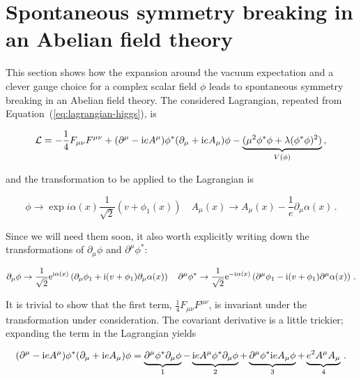 \clearpage
\section{Spontaneous symmetry breaking in an Abelian field theory}
\label{app:theory}

This section shows how the expansion around the vacuum expectation and a clever gauge choice for a complex scalar field $\phi$ leads to spontaneous symmetry breaking in an Abelian field theory.
% 
The considered Lagrangian, repeated from Equation~(\ref{eq:lagrangian-higgs}), is
% 
\begin{linenomath*}
\begin{equation}
\label{eq:lagrangian-higgs-copy}
\mathcal{L} =
    -\frac{1}{4} F_{\mu\nu} F^{\mu\nu}
    + (\partial^\mu - \mathrm{i} e A^\mu) \phi^\ast (\partial_\mu + \mathrm{i} e A_\mu) \phi
    - \underbrace{(\mu^2 \phi^\ast \phi + \lambda (\phi^\ast \phi)^2)}_{V(\phi)}
\,,
\end{equation}
\end{linenomath*}
% 
and the transformation to be applied to the Lagrangian is
% 
\begin{linenomath*}
\begin{equation}
\label{eq:transformation-higgs-copy}
\phi \to \exp{i\alpha(x)} \frac{1}{\sqrt{2}} \left( v + \phi_1(x) \right)
\quad
A_\mu(x) \to A_\mu(x) - \frac{1}{e} \partial_\mu \alpha(x)
\,.
\end{equation}
\end{linenomath*}
% 
Since we will need them soon, it also worth explicitly writing down the transformations of $\partial_\mu \phi$ and $\partial^\mu \phi^\ast$:
% 
\begin{linenomath*}
\begin{equation}
\partial_\mu \phi \to
    \frac{1}{\sqrt{2}} \mathrm{e}^{\mathrm{i} \alpha(x)} \left(
    \partial_\mu \phi_1 + \mathrm{i} (v+\phi_1) \partial_\mu \alpha(x)
    \right)
\quad
\partial^\mu \phi^\ast \to
    \frac{1}{\sqrt{2}} \mathrm{e}^{-\mathrm{i} \alpha(x)} \left(
    \partial^\mu \phi_1 - \mathrm{i} (v+\phi_1) \partial^\mu \alpha(x)
    \right)
\,.
\end{equation}
\end{linenomath*}
% 
It is trivial to show that the first term, $\frac{1}{4} F_{\mu\nu} F^{\mu\nu}$, is invariant under the transformation under consideration.
% 
The covariant derivative is a little trickier; expanding the term in the Lagrangian yields
% 
\begin{linenomath*}
\begin{equation}
\label{eq:covariant-derivative}
(\partial^\mu - \mathrm{i} e A^\mu) \phi^\ast (\partial_\mu + \mathrm{i} e A_\mu) \phi
=
\underbrace{\partial^\mu \phi^\ast \partial_\mu \phi}_1
- \underbrace{\mathrm{i} e A^\mu \phi^\ast \partial_\mu \phi}_2
+ \underbrace{\partial^\mu \phi^\ast \mathrm{i} e A_\mu \phi}_3
+ \underbrace{e^2 A^\mu A_\mu}_4
\,.
\end{equation}
\end{linenomath*}
